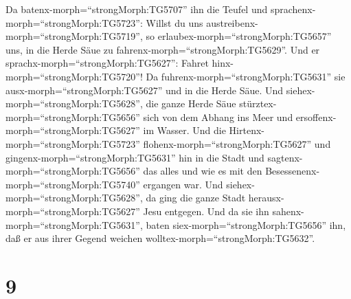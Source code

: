  Da batenx-morph=``strongMorph:TG5707'' ihn die Teufel und
sprachenx-morph=``strongMorph:TG5723'': Willst du uns
austreibenx-morph=``strongMorph:TG5719'', so
erlaubex-morph=``strongMorph:TG5657'' uns, in die Herde Säue zu
fahrenx-morph=``strongMorph:TG5629''.  Und er
sprachx-morph=``strongMorph:TG5627'': Fahret
hinx-morph=``strongMorph:TG5720''! Da
fuhrenx-morph=``strongMorph:TG5631'' sie
ausx-morph=``strongMorph:TG5627'' und in die Herde Säue. Und
siehex-morph=``strongMorph:TG5628'', die ganze Herde Säue
stürztex-morph=``strongMorph:TG5656'' sich von dem Abhang ins Meer und
ersoffenx-morph=``strongMorph:TG5627'' im Wasser.  Und die
Hirtenx-morph=``strongMorph:TG5723''
flohenx-morph=``strongMorph:TG5627'' und
gingenx-morph=``strongMorph:TG5631'' hin in die Stadt und
sagtenx-morph=``strongMorph:TG5656'' das alles und wie es mit den
Besessenenx-morph=``strongMorph:TG5740'' ergangen war.  Und
siehex-morph=``strongMorph:TG5628'', da ging die ganze Stadt
herausx-morph=``strongMorph:TG5627'' Jesu entgegen. Und da sie ihn
sahenx-morph=``strongMorph:TG5631'', baten
siex-morph=``strongMorph:TG5656'' ihn, daß er aus ihrer Gegend weichen
wolltex-morph=``strongMorph:TG5632''.

\hypertarget{section-8}{%
\section{9}\label{section-8}}

